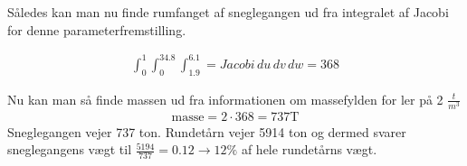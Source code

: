 Således kan man nu finde rumfanget af sneglegangen ud fra integralet af Jacobi for denne parameterfremstilling.

\begin{align}
    \int^{1}_0 \int^{34.8}_0 \int^{6.1}_1.9= Jacobi \,du \,dv \,dw = 368
\end{align}

Nu kan man så finde massen ud fra informationen om massefylden for ler på 2 $\frac{t}{m^3}$
\begin{align}
    \text{masse} = 2 \cdot 368 = 737 \text{T}
\end{align}
Sneglegangen vejer 737 ton. Rundetårn vejer 5914 ton og dermed svarer sneglegangens vægt til $\frac{5194}{737} = 0.12 \rightarrow 12\%$ af hele rundetårns vægt.

